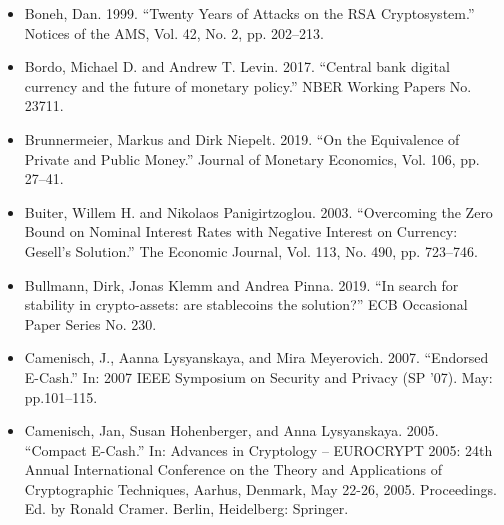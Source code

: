 \documentclass[10pt,spanish]{article}
\begin{document}
\begin{itemize}
\item Boneh, Dan. 1999. ``Twenty Years of Attacks on the RSA Cryptosystem.''
Notices of the AMS, Vol. 42, No. 2, pp. 202--213.
\end{itemize}

\begin{itemize}
\item Bordo, Michael D. and Andrew T. Levin. 2017. ``Central bank digital
currency and the future of monetary policy.'' NBER Working Papers No.
23711.
\end{itemize}

\begin{itemize}
\item Brunnermeier, Markus and Dirk Niepelt. 2019. ``On the Equivalence of
Private and Public Money.'' Journal of Monetary Economics, Vol. 106, pp.
27--41.
\end{itemize}

\begin{itemize}
\item Buiter, Willem H. and Nikolaos Panigirtzoglou. 2003. ``Overcoming the
Zero Bound on Nominal Interest Rates with Negative Interest on Currency:
Gesell's Solution.'' The Economic Journal, Vol. 113, No. 490, pp.
723--746.
\end{itemize}

\begin{itemize}
\item Bullmann, Dirk, Jonas Klemm and Andrea Pinna. 2019. ``In search for
stability in crypto-assets: are stablecoins the solution?'' ECB
Occasional Paper Series No. 230.
\end{itemize}

\begin{itemize}
\item Camenisch, J., Aanna Lysyanskaya, and Mira Meyerovich. 2007. ``Endorsed
E-Cash.'' In: 2007 IEEE Symposium on Security and Privacy (SP '07). May:
pp.101--115.
\end{itemize}

\begin{itemize}
\item Camenisch, Jan, Susan Hohenberger, and Anna Lysyanskaya. 2005. ``Compact
E-Cash.'' In: Advances in Cryptology -- EUROCRYPT 2005: 24th Annual
International Conference on the Theory and Applications of Cryptographic
Techniques, Aarhus, Denmark, May 22-26, 2005. Proceedings. Ed. by Ronald
Cramer. Berlin, Heidelberg: Springer.
\end{itemize}
\end{document}
